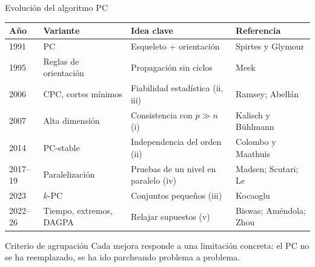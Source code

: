 \documentclass[aspectratio=169,11pt]{beamer}
\begin{document}
\begin{frame}[t]{Evolución del algoritmo PC}
  \footnotesize
  \renewcommand{\arraystretch}{1.12}
  \setlength{\tabcolsep}{3pt}
  \begin{tabular}{@{}p{}p{}p{}p{}@{}}
    \toprule
    \textbf{Año} & \textbf{Variante} & \textbf{Idea clave} & \textbf{Referencia} \\
    \midrule
    1991    & PC                   & Esqueleto + orientación              & Spirtes y Glymour \\
    1995    & Reglas de orientación & Propagación sin ciclos               & Meek \\
    2006    & CPC, cortes mínimos  & Fiabilidad estadística (ii, iii)     & Ramsey; Abellán \\
    2007    & Alta dimensión       & Consistencia con $p\gg n$ (i)        & Kalisch y Bühlmann \\
    2014    & PC-stable            & Independencia del orden (ii)         & Colombo y Maathuis \\
    2017--19 & Paralelización      & Pruebas de un nivel en paralelo (iv) & Madsen; Scutari; Le \\
    2023    & $k$-PC               & Conjuntos pequeños (iii)             & Kocaoglu \\
    2022--26 & Tiempo, extremos, DAGPA & Relajar supuestos (v)            & Biswas; Améndola; Zhou \\
    \bottomrule
  \end{tabular}
  \vspace{0.3cm}
  \begin{block}{Criterio de agrupación}
    Cada mejora responde a una limitación concreta: el PC no se ha
    reemplazado, se ha ido parcheando problema a problema.
  \end{block}
\end{frame}
\end{document}
